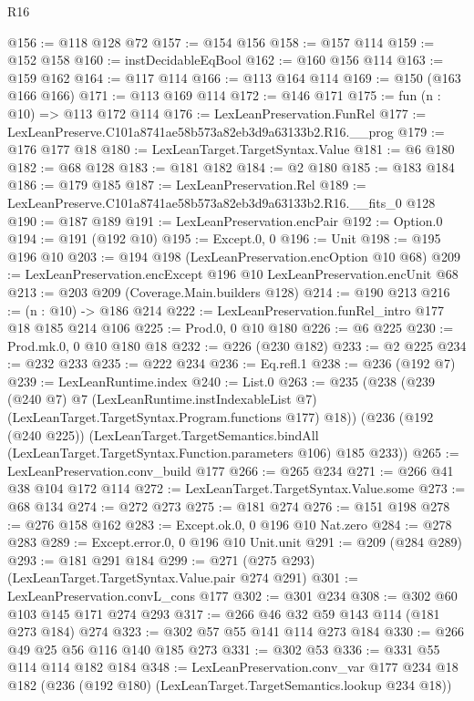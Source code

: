 \begin{lexlean}{R16}
\begin{coremodule}
@156 := @118 @128 @72
@157 := @154 @156
@158 := @157 @114
@159 := @152 @158
@160 := instDecidableEqBool
@162 := @160 @156 @114
@163 := @159 @162
@164 := @117 @114
@166 := @113 @164 @114
@169 := @150 (@163 @166 @166)
@171 := @113 @169 @114
@172 := @146 @171
@175 := fun (n : @10) => @113 @172 @114
@176 := LexLeanPreservation.FunRel
@177 := LexLeanPreserve.C101a8741ae58b573a82eb3d9a63133b2.R16.__prog
@179 := @176 @177 @18
@180 := LexLeanTarget.TargetSyntax.Value
@181 := @6 @180
@182 := @68 @128
@183 := @181 @182
@184 := @2 @180
@185 := @183 @184
@186 := @179 @185
@187 := LexLeanPreservation.Rel
@189 := LexLeanPreserve.C101a8741ae58b573a82eb3d9a63133b2.R16.__fits_0 @128
@190 := @187 @189
@191 := LexLeanPreservation.encPair
@192 := Option.{0}
@194 := @191 (@192 @10)
@195 := Except.{0, 0}
@196 := Unit
@198 := @195 @196 @10
@203 := @194 @198 (LexLeanPreservation.encOption @10 @68)
@209 := LexLeanPreservation.encExcept @196 @10 LexLeanPreservation.encUnit @68
@213 := @203 @209 (Coverage.Main.builders @128)
@214 := @190 @213
@216 := (n : @10) -> @186 @214
@222 := LexLeanPreservation.funRel_intro @177 @18 @185 @214 @106
@225 := Prod.{0, 0} @10 @180
@226 := @6 @225
@230 := Prod.mk.{0, 0} @10 @180 @18
@232 := @226 (@230 @182)
@233 := @2 @225
@234 := @232 @233
@235 := @222 @234
@236 := Eq.refl.{1}
@238 := @236 (@192 @7)
@239 := LexLeanRuntime.index
@240 := List.{0}
@263 := @235
    (@238
      (@239
        (@240 @7)
        @7
        (LexLeanRuntime.instIndexableList @7)
        (LexLeanTarget.TargetSyntax.Program.functions @177)
        @18))
    (@236
      (@192 (@240 @225))
      (LexLeanTarget.TargetSemantics.bindAll
        (LexLeanTarget.TargetSyntax.Function.parameters @106)
        @185
        @233))
@265 := LexLeanPreservation.conv_build @177
@266 := @265 @234
@271 := @266 @41 @38 @104 @172 @114
@272 := LexLeanTarget.TargetSyntax.Value.some
@273 := @68 @134
@274 := @272 @273
@275 := @181 @274
@276 := @151 @198
@278 := @276 @158 @162
@283 := Except.ok.{0, 0} @196 @10 Nat.zero
@284 := @278 @283
@289 := Except.error.{0, 0} @196 @10 Unit.unit
@291 := @209 (@284 @289)
@293 := @181 @291 @184
@299 := @271 (@275 @293) (LexLeanTarget.TargetSyntax.Value.pair @274 @291)
@301 := LexLeanPreservation.convL_cons @177
@302 := @301 @234
@308 := @302 @60 @103 @145 @171 @274 @293
@317 := @266 @46 @32 @59 @143 @114 (@181 @273 @184) @274
@323 := @302 @57 @55 @141 @114 @273 @184
@330 := @266 @49 @25 @56 @116 @140 @185 @273
@331 := @302 @53
@336 := @331 @55 @114 @114 @182 @184
@348 := LexLeanPreservation.conv_var
    @177
    @234
    @18
    @182
    (@236 (@192 @180) (LexLeanTarget.TargetSemantics.lookup @234 @18))

\end{coremodule}
\end{lexlean}

